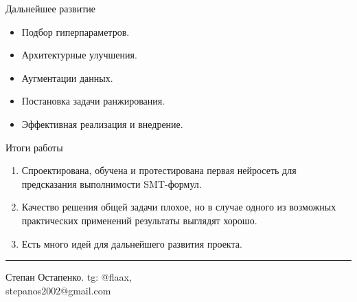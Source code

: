 \documentclass[14pt,aspectratio=169,hyperref={pdftex,unicode},xcolor=dvipsnames]{beamer}
\begin{document}
\begin{frame}{Дальнейшее развитие}

\begin{itemize}
  \item Подбор гиперпараметров.
  \item Архитектурные улучшения.
  \item Аугментации данных.
  \item Постановка задачи ранжирования.
  \item Эффективная реализация и внедрение.
\end{itemize}

\end{frame}



\begin{frame}{Итоги работы}

\begin{enumerate}
  \item Спроектирована, обучена и протестирована первая нейросеть для предсказания выполнимости SMT-формул.
  \item Качество решения общей задачи плохое, но в случае одного из возможных практических применений результаты выглядят хорошо.
  \item Есть много идей для дальнейшего развития проекта.
\end{enumerate}

\vspace{2mm}\hrule

\begin{minipage}{0.5\textwidth}
\begin{center}

Степан Остапенко. tg: @flaax, \\ stepanos2002@gmail.com

\end{center}
\end{minipage}%
\begin{minipage}{0.5\textwidth}
\begin{center}


\end{center}
\end{minipage}
\end{frame}
\end{document}
